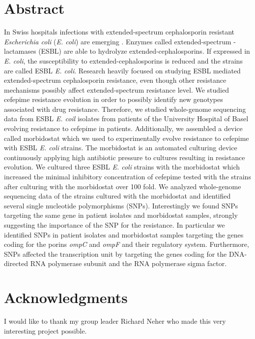 \documentclass[12pt,twoside]{report}
\begin{document}
\chapter*{Abstract}
In Swiss hospitals infections with extended-spectrum cephalosporin resistant \textit{Escherichia coli} (\textit{E. coli}) are emerging \cite{swiss_hospitals}. Enzymes called extended-spectrum \textbeta-lactamases (ESBL) are able to hydrolyze extended-cephalosporins. If expressed in \textit{E. coli}, the susceptibility to extended-cephalosporins is reduced and the strains are called ESBL \textit{E. coli}. Research  heavily focused on studying ESBL mediated extended-spectrum cephalosporin resistance, even though other resistance mechanisms possibly affect extended-spectrum resistance level. We studied cefepime resistance evolution in order to possibly identify new genotypes associated with drug resistance. Therefore, we studied whole-genome sequencing data from ESBL \textit{E. coil} isolates from patients of the University Hospital of Basel evolving resistance to cefepime in patients. Additionally, we assembled a device called morbidostat which we used to experimentally evolve resistance to cefepime with ESBL \textit{E. coli} strains. The morbidostat is an automated culturing device continuously applying high antibiotic pressure to cultures resulting in resistance evolution. We cultured three ESBL \textit{E. coli} strains with the morbidostat which increased the minimal inhibitory concentration of cefepime tested with the strains after culturing with the morbidostat over 100 fold. We analyzed whole-genome sequencing data of the strains cultured with the morbidostat and identified several single nucleotide polymorphisms (SNPs). Interestingly we found SNPs targeting the same gene in patient isolates and morbidostat samples, strongly suggesting the importance of the SNP for the resistance. In particular we identified SNPs in patient isolates and morbidostat samples targeting the genes coding for the porins \textit{ompC} and \textit{ompF} and their regulatory system. Furthermore, SNPs affected the transcription unit by targeting the genes coding for the DNA-directed RNA polymerase subunit \textbeta \space and the RNA polymerase sigma factor.  
\chapter*{Acknowledgments}
I would like to thank my group leader Richard Neher who made this very interesting project possible. 
\tableofcontents
{}
\end{document}

